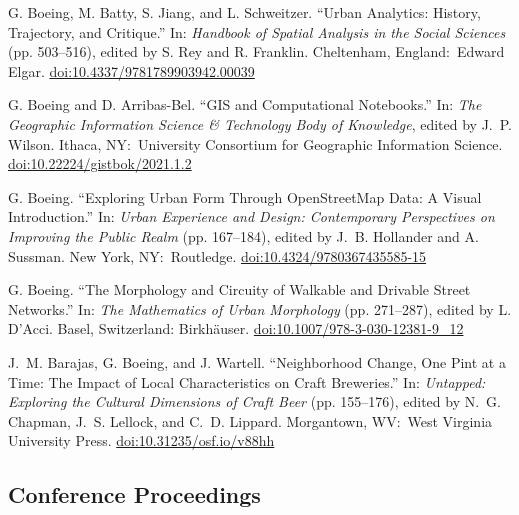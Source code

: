 \documentclass[11pt,a4paper]{report} %
\begin{document}
\begin{tablist}

\item[2022] \tab{}G. Boeing, M. Batty, S. Jiang, and L. Schweitzer. \enquote{Urban Analytics: History, Trajectory, and Critique.} In: \textit{Handbook of Spatial Analysis in the Social Sciences} (pp. 503--516), edited by S. Rey and R. Franklin. Cheltenham, England:\ Edward Elgar. \href{https://doi.org/10.4337/9781789903942.00039}{doi:10.4337/9781789903942.00039}

\item[2021] \tab{}G. Boeing and D. Arribas-Bel. \enquote{GIS and Computational Notebooks.} In: \textit{The Geographic Information Science \& Technology Body of Knowledge}, edited by J.~P. Wilson. Ithaca, NY:\ University Consortium for Geographic Information Science. \href{https://doi.org/10.22224/gistbok/2021.1.2}{doi:10.22224/gistbok/2021.1.2}

\item[2021] \tab{}G. Boeing. \enquote{Exploring Urban Form Through OpenStreetMap Data: A Visual Introduction.} In: \textit{Urban Experience and Design: Contemporary Perspectives on Improving the Public Realm} (pp. 167--184), edited by J.~B. Hollander and A. Sussman. New York, NY:\ Routledge. \href{https://doi.org/10.4324/9780367435585-15}{doi:10.4324/9780367435585-15}

\item[2019] \tab{}G. Boeing. \enquote{The Morphology and Circuity of Walkable and Drivable Street Networks.} In: \textit{The Mathematics of Urban Morphology} (pp. 271--287), edited by L. D'Acci. Basel, Switzerland: Birkh{\"a}user. \href{https://doi.org/10.1007/978-3-030-12381-9_12}{doi:10.1007/978-3-030-12381-9\_12}

\item[2017] \tab{}J.~M. Barajas, G. Boeing, and J. Wartell. \enquote{Neighborhood Change, One Pint at a Time: The Impact of Local Characteristics on Craft Breweries.} In: \textit{Untapped: Exploring the Cultural Dimensions of Craft Beer} (pp. 155--176), edited by N.~G. Chapman, J.~S. Lellock, and C.~D. Lippard. Morgantown, WV:\ West Virginia University Press. \href{https://doi.org/10.31235/osf.io/v88hh}{doi:10.31235/osf.io/v88hh}

\end{tablist}

\subsection*{Conference Proceedings}
\end{document}

